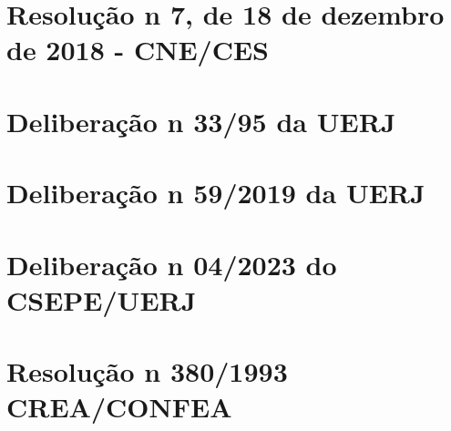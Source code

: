 \chapter{Resolução n\textordmasculine{} 7, de 18 de dezembro de 2018 - CNE/CES}
\label{rcne2018}

\chapter{Deliberação n\textordmasculine{} 33/95 da UERJ}
\label{delib3395}

\chapter{Deliberação n\textordmasculine{} 59/2019 da UERJ}
\label{delib592019}

\chapter{Deliberação n\textordmasculine{} 04/2023 do CSEPE/UERJ}
\label{del4}

\chapter{Resolução n\textordmasculine{} 380/1993 CREA/CONFEA}
\label{confea1993}


